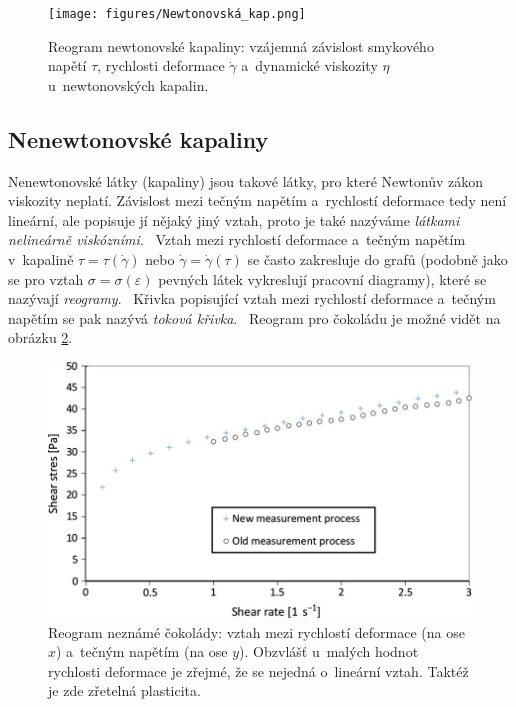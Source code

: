 \documentclass[12pt]{article}
\begin{document}
\begin{figure}
    \centering
    \texttt{[image: figures/Newtonovská\_kap.png]}
    \caption{Reogram newtonovské kapaliny: vzájemná závislost smykového napětí $\tau$, rychlosti deformace $\dot\gamma$ a~dynamické viskozity $\eta$ u~newtonovských kapalin.~\cite{thesis:Viskozimetr_pro_viskozni_materialy}}
    \label{fig:Newtonovská_kapalina}
\end{figure}

\subsection{Nenewtonovské kapaliny}%

Nenewtonovské látky (kapaliny) jsou takové látky, pro které Newtonův zákon viskozity neplatí. Závislost mezi tečným napětím a~rychlostí deformace tedy není lineární, ale popisuje jí nějaký jiný vztah, proto je také nazýváme \emph{látkami nelineárně viskózními}.~\cite{wiki:Newtonská_tekutina}
Vztah mezi rychlostí deformace a~tečným napětím v~kapalině $\tau = \tau(\dot\gamma)$ nebo $\dot\gamma = \dot\gamma(\tau)$ se často zakresluje do grafů (podobně jako se pro vztah $\sigma = \sigma(\varepsilon)$ pevných látek vykreslují pracovní diagramy), které se nazývají \emph{reogramy}.~\cite{material:Viskozita_a_povrchove_napeti} Křivka popisující vztah mezi rychlostí deformace a~tečným napětím se pak nazývá \emph{toková křivka}.~\cite{material:Tokove_chovani_reologicke_modely} Reogram pro čokoládu je možné vidět na obrázku \ref{fig:diagram_cokolada}.

\begin{figure}
    \centering
    \includegraphics[width = 0.75\linewidth]{figures/diagram_viskozity_čokoláda.jpg}
    \caption{Reogram neznámé čokolády: vztah mezi rychlostí deformace (na ose $x$) a~tečným napětím (na ose $y$). Obzvlášť u~malých hodnot rychlosti deformace je zřejmé, že se nejedná o~lineární vztah. Taktéž je zde zřetelná plasticita.~\cite{Figure:chocolate_shear_stress}}
    \label{fig:diagram_cokolada}
\end{figure}
\end{document}

